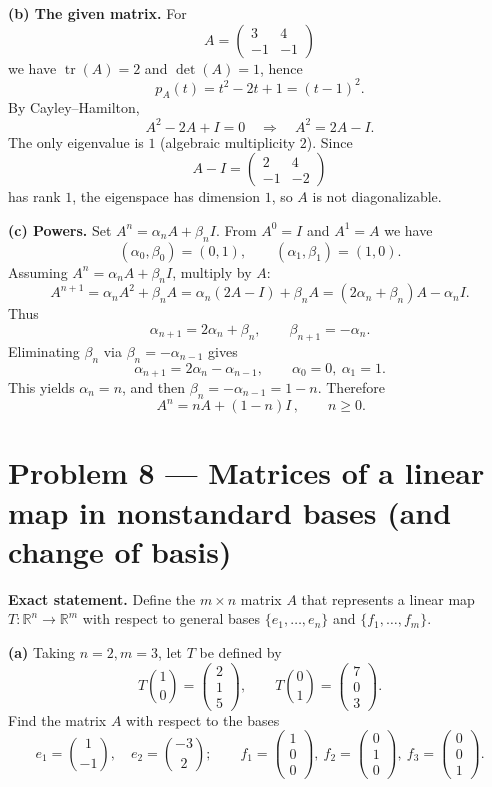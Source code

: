 \documentclass[12pt,a4paper]{article}
\DeclareMathOperator{\tr}{tr}
\theoremstyle{plain}
\theoremstyle{definition}      %
\begin{document}
\textbf{(b) The given matrix.}
For
\[
A=\begin{pmatrix}3&4\\-1&-1\end{pmatrix}
\]
we have $\tr(A)=2$ and $\det(A)=1$, hence
\[
p_A(t)=t^2-2t+1=(t-1)^2.
\]
By Cayley--Hamilton,
\[
A^2-2A+I=0 \quad\Longrightarrow\quad A^2=2A-I.
\]
The only eigenvalue is $1$ (algebraic multiplicity $2$). Since
\[
A-I=\begin{pmatrix}2&4\\-1&-2\end{pmatrix}
\]
has rank $1$, the eigenspace has dimension $1$, so $A$ is not diagonalizable.

\textbf{(c) Powers.}
Set $A^n=\alpha_n A+\beta_n I$. From $A^0=I$ and $A^1=A$ we have
\[
(\alpha_0,\beta_0)=(0,1),\qquad (\alpha_1,\beta_1)=(1,0).
\]
Assuming $A^n=\alpha_n A+\beta_n I$, multiply by $A$:
\[
A^{n+1}=\alpha_n A^2+\beta_n A=\alpha_n(2A-I)+\beta_n A=(2\alpha_n+\beta_n)A-\alpha_n I.
\]
Thus
\[
\alpha_{n+1}=2\alpha_n+\beta_n,\qquad \beta_{n+1}=-\alpha_n.
\]
Eliminating $\beta_n$ via $\beta_n=-\alpha_{n-1}$ gives
\[
\alpha_{n+1}=2\alpha_n-\alpha_{n-1},\qquad \alpha_0=0,\ \alpha_1=1.
\]
This yields $\alpha_n=n$, and then $\beta_n=-\alpha_{n-1}=1-n$. Therefore
\[
\boxed{\,A^n=nA+(1-n)I\,,\qquad n\ge 0.}
\]

\section*{Problem 8 — Matrices of a linear map in nonstandard bases (and change of basis)}

\textbf{Exact statement.}
Define the $m\times n$ matrix $A$ that represents a linear map $T:\mathbb R^n\to\mathbb R^m$ with respect to general bases
$\{e_1,\dots,e_n\}$ and $\{f_1,\dots,f_m\}$.

\textbf{(a)} Taking $n=2,m=3$, let $T$ be defined by
\[
T\binom10=\begin{pmatrix}2\\1\\5\end{pmatrix},\qquad
T\binom01=\begin{pmatrix}7\\0\\3\end{pmatrix}.
\]
Find the matrix $A$ with respect to the bases
\[
e_1=\binom{1}{-1},\quad e_2=\binom{-3}{2};\qquad
f_1=\begin{pmatrix}1\\0\\0\end{pmatrix},\ 
f_2=\begin{pmatrix}0\\1\\0\end{pmatrix},\ 
f_3=\begin{pmatrix}0\\0\\1\end{pmatrix}.
\]
\end{document}
